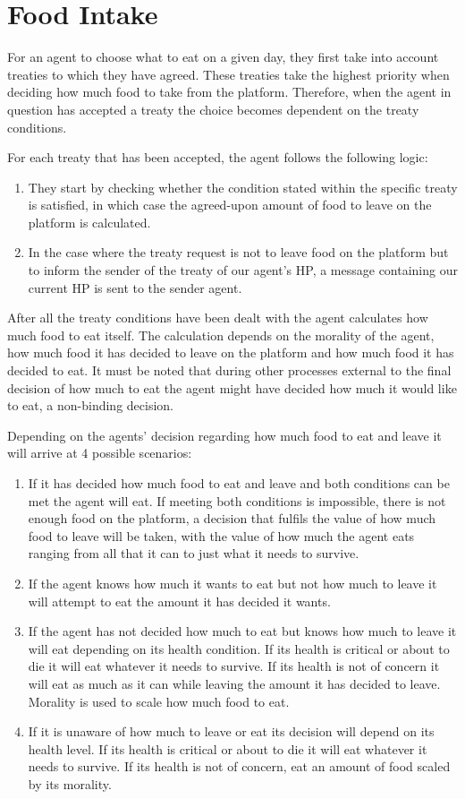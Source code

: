 \section{Food Intake}\label{sec:food_intake}
For an agent to choose what to eat on a given day, they first take into account treaties to which they have agreed. These treaties take the highest priority when deciding how much food to take from the platform. Therefore, when the agent in question has accepted a treaty the choice becomes dependent on the treaty conditions. \par 
For each treaty that has been accepted, the agent follows the following logic: 
\begin{enumerate}
    \item They start by checking whether the condition stated within the specific treaty is satisfied, in which case the agreed-upon amount of food to leave on the platform is calculated. 
    \item In the case where the treaty request is not to leave food on the platform but to inform the sender of the treaty of our agent's HP, a message containing our current HP is sent to the sender agent. 
\end{enumerate}
After all the treaty conditions have been dealt with the agent calculates how much food to eat itself. The calculation depends on the morality of the agent, how much food it has decided to leave on the platform and how much food it has decided to eat. It must be noted that during other processes external to the final decision of how much to eat the agent might have decided how much it would like to eat, a non-binding decision. \par
Depending on the agents’ decision regarding how much food to eat and leave it will arrive at 4 possible scenarios: 
\begin{enumerate}
    \item If it has decided how much food to eat and leave and both conditions can be met the agent will eat. If meeting both conditions is impossible, there is not enough food on the platform, a decision that fulfils the value of how much food to leave will be taken, with the value of how much the agent eats ranging from all that it can to just what it needs to survive. 
    \item If the agent knows how much it wants to eat but not how much to leave it will attempt to eat the amount it has decided it wants.
    \item If the agent has not decided how much to eat but knows how much to leave it will eat depending on its health condition. If its health is critical or about to die it will eat whatever it needs to survive. If its health is not of concern it will eat as much as it can while leaving the amount it has decided to leave. Morality is used to scale how much food to eat.
    \item If it is unaware of how much to leave or eat its decision will depend on its health level. If its health is critical or about to die it will eat whatever it needs to survive. If its health is not of concern, eat an amount of food scaled by its morality.
\end{enumerate}